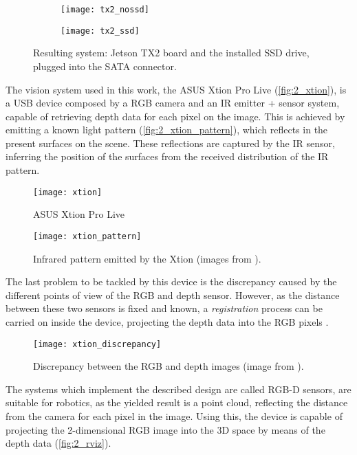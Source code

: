 \begin{figure}[h]
	\begin{subfigure}[h]{0.45\linewidth}
		\centering
		\texttt{[image: tx2\_nossd]}
	\end{subfigure}
	\begin{subfigure}[h]{0.45\linewidth}
		\centering
		\texttt{[image: tx2\_ssd]}
	\end{subfigure}
	\caption{Resulting system: Jetson TX2 board and the installed SSD drive, plugged into the SATA connector.}
	\label{fig:2_mytx2}
\end{figure}

The vision system used in this work, the ASUS Xtion Pro Live (\autoref{fig:2_xtion}), is a USB device composed by a RGB camera and an IR emitter + sensor system, capable of retrieving depth data for each pixel on the image. This is achieved by emitting a known light pattern (\autoref{fig:2_xtion_pattern}), which reflects in the present surfaces on the scene. These reflections are captured by the IR sensor, inferring the position of the surfaces from the received distribution of the IR pattern.

\begin{figure}[h]
	\centering
	\texttt{[image: xtion]}
	\caption{ASUS Xtion Pro Live}
	\label{fig:2_xtion}
\end{figure}

\begin{figure}[h]
	\centering
	\texttt{[image: xtion\_pattern]}
	\caption{Infrared pattern emitted by the Xtion (images from \cite{rgbd_poses}).}
	\label{fig:2_xtion_pattern}
\end{figure}

The last problem to be tackled by this device is the discrepancy caused by the different points of view of the RGB and depth sensor. However, as the distance between these two sensors is fixed and known, a \textit{registration} process can be carried on inside the device, projecting the depth data into the RGB pixels \cite{diapos_cv_registration}.\\

\begin{figure}[h]
	\centering
	\texttt{[image: xtion\_discrepancy]}
	\caption{Discrepancy between the RGB and depth images (image from \cite{tfg}).}
	\label{fig:2_xtion_discrepancy}
\end{figure}

The systems which implement the described design are called RGB-D sensors, are suitable for robotics, as the yielded result is a point cloud, reflecting the distance from the camera for each pixel in the image. Using this, the device is capable of projecting the 2-dimensional RGB image into the 3D space by means of the depth data (\autoref{fig:2_rviz}).\\

